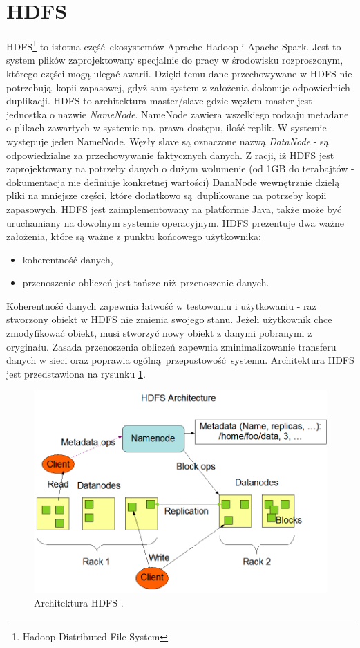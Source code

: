 \section{HDFS}
HDFS\footnote{Hadoop Distributed File System} to istotna część ekosystemów Aprache Hadoop i Apache Spark. Jest to system plików zaprojektowany specjalnie do pracy w środowisku rozproszonym, którego części mogą ulegać awarii. Dzięki temu dane przechowywane w HDFS nie potrzebują kopii zapasowej, gdyż sam system z założenia dokonuje odpowiednich duplikacji. HDFS to architektura master/slave gdzie węzłem master jest jednostka o nazwie \textit{NameNode}. NameNode zawiera wszelkiego rodzaju metadane o plikach zawartych w systemie np. prawa dostępu, ilość replik. W systemie występuje jeden NameNode. Węzły slave są oznaczone nazwą \textit{DataNode} - są odpowiedzialne za przechowywanie faktycznych danych. Z racji, iż HDFS jest zaprojektowany na potrzeby danych o dużym wolumenie (od 1GB do terabajtów - dokumentacja nie definiuje konkretnej wartości) DanaNode wewnętrznie dzielą pliki na mniejsze części, które dodatkowo są duplikowane na potrzeby kopii zapasowych. HDFS jest zaimplementowany na platformie Java, także może być uruchamiany na dowolnym systemie operacyjnym. HDFS prezentuje dwa ważne założenia, które są ważne z punktu końcowego użytkownika:
\begin{itemize}
	\item koherentność danych,
	\item przenoszenie obliczeń jest tańsze niż przenoszenie danych.
\end{itemize}
Koherentność danych zapewnia łatwość w testowaniu i użytkowaniu - raz stworzony obiekt w HDFS nie zmienia swojego stanu. Jeżeli użytkownik chce zmodyfikować obiekt, musi stworzyć nowy obiekt z danymi pobranymi z oryginału. Zasada przenoszenia obliczeń zapewnia zminimalizowanie transferu danych w sieci oraz poprawia ogólną przepustowość systemu\cite{HDFS}. Architektura HDFS jest przedstawiona na rysunku \ref{fig:@=hdfs_architecture}.
\begin{figure}
	\centering
	\includegraphics[scale=0.3]{hdfsarchitecture.png}
	\caption{Architektura HDFS \cite{HDFS_architecture}.}
	\label{fig:@=hdfs_architecture}
\end{figure}
